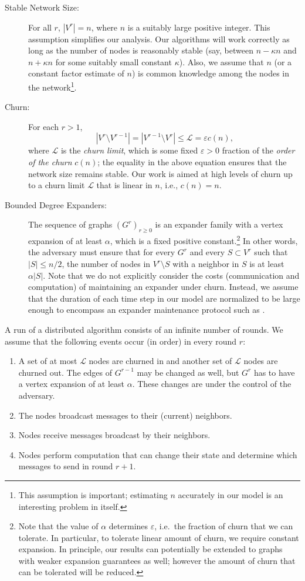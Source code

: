 \documentclass[leqno,11pt]{article}
\renewcommand{\geq}{\geqslant}
\renewcommand{\le}{\leqslant}
\newcommand{\eps}{\varepsilon}
\renewcommand{\L}{{\mathcal{L}}}
\begin{document}
\begin{description}
\item[Stable Network Size:] For all $r$, $|V^r| = n$, where $n$ is a suitably
  large positive integer.  This assumption simplifies our analysis. Our algorithms will work correctly as long as the number of nodes is reasonably stable (say, between $n - \kappa n$ and $n+\kappa n$ for some suitably small constant  $\kappa$). Also, we assume that $n$ (or a constant factor estimate of $n$) is common knowledge among the nodes in
  the network\footnote{This assumption is important; estimating $n$ accurately in our model is an interesting problem in itself.}.
\item[Churn:]  For each $r>1$, 
$$|V^r \setminus V^{r-1}| = |V^{r-1} \setminus V^{r}| \le \L = \eps c(n)
  \text{,}$$
where $\L$ is the {\em churn limit}, which is some fixed $\eps>0$ fraction of the
\emph{order of the churn} $c(n)$; the equality in the above equation
ensures that the network size remains stable.  Our work is aimed at high levels
of churn up to a churn limit $\L$ that is linear in $n$, i.e., $c(n) = n$. 
\item[Bounded Degree Expanders:] The sequence of graphs $(G^r)_{r\geq 0}$ is an
  expander family with a vertex expansion of at least $\alpha$, which is a fixed positive constant.\footnote{Note that the value of $\alpha$ determines $\eps$, i.e.\ the fraction of churn that we can tolerate. In particular, to tolerate
 linear amount of churn, we require constant expansion.  In principle, our results can potentially be extended to graphs with weaker expansion guarantees as well; however the amount of churn that can be tolerated will
 be reduced.}
  In
  other words, the adversary must ensure that for every $G^r$ and  every $S \subset V^r$ such that $|S| \le n/2$,
  the number of nodes in $V^r \setminus S$ with a neighbor in $S$ is at least
  $\alpha |S|$.   
  Note that we do not explicitly consider the costs (communication and computation) of maintaining an expander under churn.
  Instead, we assume that the duration of each time step in our model are normalized to be large enough to encompass an expander maintenance protocol such as \cite{LS03,IPDPS14}.
  
\end{description}

A run of a distributed algorithm consists of an infinite number of
rounds. 
We assume that the following events occur (in order) in every round $r$:
\begin{enumerate}
    \item  A set of at most $\L$ nodes are churned in and another set of $\L$
      nodes are churned out. The edges of $G^{r-1}$ may be changed as well, but
      $G^r$ has to have a vertex expansion of at least $\alpha$. These changes
      are under the control of the adversary.
\item  The nodes broadcast messages to their (current) neighbors. 
    \item  Nodes receive messages broadcast by their neighbors.
    \item  Nodes perform computation that can change their state and determine
      which messages to send in round $r+1$.
		\end{enumerate}
\end{document}
